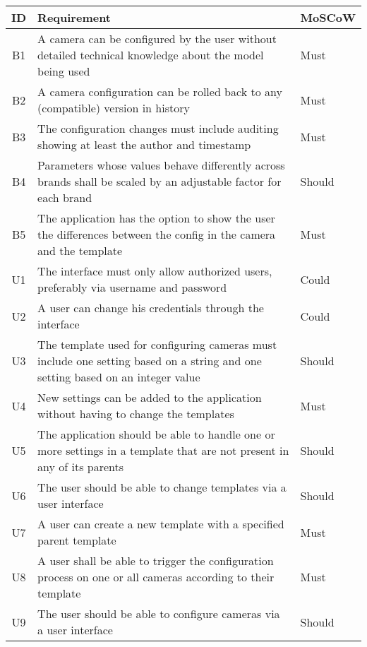 \begin{table*}[h]
    \centering
    \begin{tabulary}{\linewidth}{CLL}
        \textbf{ID} & \textbf{Requirement} & \textbf{MoSCoW}
        \\ \hline
        B1 & A camera can be configured by the user without detailed technical knowledge about the model being used & Must
        \\ \hline
		B2 & A camera configuration can be rolled back to any (compatible) version in history & Must
        \\ \hline
        B3 & The configuration changes must include auditing showing at least the author and timestamp & Must
        \\ \hline
        B4 & Parameters whose values behave differently across brands shall be scaled by an adjustable factor for each brand & Should
        \\ \hline
        B5 & The application has the option to show the user the differences between the config in the camera and the template & Must
        \\ \hline
        U1 & The interface must only allow authorized users, preferably via username and password & Could
        \\ \hline
        U2 & A user can change his credentials through the interface & Could
        \\ \hline
        U3 & The template used for configuring cameras must include one setting based on a string and one setting based on an integer value & Should
        \\ \hline
        U4 & New settings can be added to the application without having to change the templates & Must
        \\ \hline
        U5 & The application should be able to handle one or more settings in a template that are not present in any of its parents & Should
        \\ \hline
        U6 & The user should be able to change templates via a user interface & Should
        \\ \hline
        U7 & A user can create a new template with a specified parent template & Must
        \\ \hline
		U8 & A user shall be able to trigger the configuration process on one or all cameras according to their template & Must
		\\ \hline
		U9 & The user should be able to configure cameras via a user interface & Should

\end{tabulary}
\end{table*}
